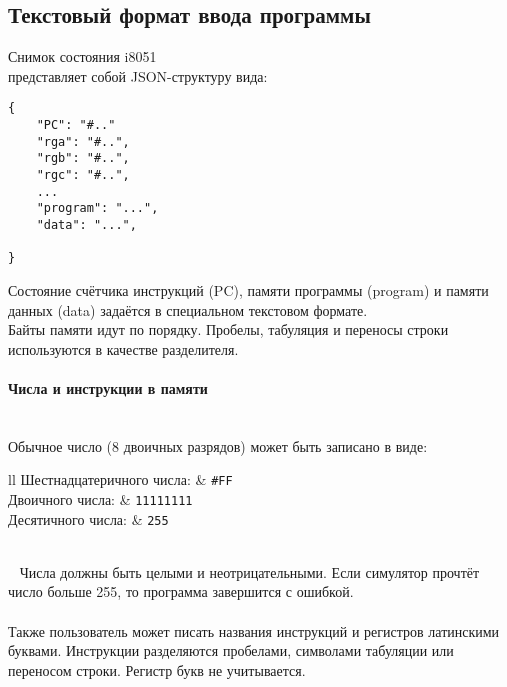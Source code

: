 \subsection{Текстовый формат ввода программы}
Снимок состояния i8051 \\ представляет собой JSON-структуру вида:\\
\begin{lstlisting}
{
	"PC": "#.."
	"rga": "#..",
	"rgb": "#..",
	"rgc": "#..",
	...
	"program": "...",
	"data": "...",
	
}
\end{lstlisting}
Состояние счётчика инструкций (PC), памяти программы (program) и памяти данных (data) задаётся в специальном текстовом формате. \\
Байты памяти идут по порядку. Пробелы, табуляция и переносы строки используются в качестве разделителя.

\paragraph{Числа и инструкции в памяти}~\\
Обычное число (8 двоичных разрядов) может быть записано в виде:
~
~\\[3mm]
\begin{tabular}{{l}{l}}
	Шестнадцатеричного числа: & {\tt\large \#FF} \\[2mm]
	Двоичного числа:          & {\tt\large 11111111} \\[2mm]
	Десятичного числа:        & {\tt\large *255} \\
\end{tabular} \\[3mm]
~
Числа должны быть целыми и неотрицательными. Если симулятор прочтёт число больше 255, то программа завершится с ошибкой.\\
~\\
Также пользователь может писать названия инструкций и регистров латинскими буквами. Инструкции разделяются пробелами, символами табуляции или переносом строки. Регистр букв не учитывается.


